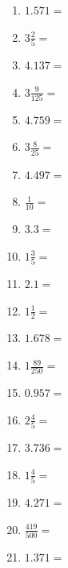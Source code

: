 \documentclass[12pt]{article}
\begin{document}
\begin{enumerate}
\item \large $ 1.571 = $ \vspace{1.5cm}
\newpage
\item \large $ 3 \frac{2}{5} = $ \vspace{1.5cm}
\item \large $ 4.137 = $ \vspace{1.5cm}
\item \large $ 3 \frac{9}{125} = $ \vspace{1.5cm}
\item \large $ 4.759 = $ \vspace{1.5cm}
\item \large $ 3 \frac{8}{25} = $ \vspace{1.5cm}
\item \large $ 4.497 = $ \vspace{1.5cm}
\item \large $ \frac{1}{10} = $ \vspace{1.5cm}
\item \large $ 3.3 = $ \vspace{1.5cm}
\item \large $ 1 \frac{3}{5} = $ \vspace{1.5cm}
\item \large $ 2.1 = $ \vspace{1.5cm}
\newpage
\item \large $ 1 \frac{1}{2} = $ \vspace{1.5cm}
\item \large $ 1.678 = $ \vspace{1.5cm}
\item \large $ 1 \frac{89}{250} = $ \vspace{1.5cm}
\item \large $ 0.957 = $ \vspace{1.5cm}
\item \large $ 2 \frac{4}{5} = $ \vspace{1.5cm}
\item \large $ 3.736 = $ \vspace{1.5cm}
\item \large $ 1 \frac{4}{5} = $ \vspace{1.5cm}
\item \large $ 4.271 = $ \vspace{1.5cm}
\item \large $ \frac{419}{500} = $ \vspace{1.5cm}
\item \large $ 1.371 = $ \vspace{1.5cm}

\end{enumerate}
\end{document}
